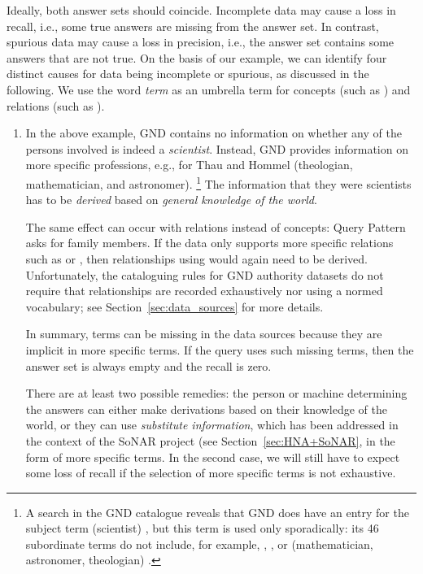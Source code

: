 Ideally, both answer sets should coincide.
Incomplete data may cause a loss in recall, i.e., some true answers are missing from the answer set.
In contrast, spurious data may cause a loss in precision, i.e., the answer set contains some answers that are not true.
On the basis of our example, we can identify four distinct causes for data being incomplete or spurious,
as discussed in the following. We use the word \emph{term} as an umbrella term for concepts (such as )
and relations (such as ).
%
\begin{enumerate}
  \item
    In the above example, \gls{GND} contains no information on whether any of the persons involved is indeed
    a \emph{scientist}. Instead, \gls{GND} provides information on more specific professions,
    e.g., for Thau and Hommel (theologian, mathematician, and astronomer).%
    \footnote{%
      A search in the \gls{GND} catalogue
      reveals that \gls{GND} does have an entry for the subject term  (scientist) \autocite{GNDScientist},
      but this term is used only sporadically: its 46 subordinate terms do not include, for example,
      , , or  (mathematician, astronomer, theologian)  \autocite{GNDScientistSub}.%
    }
    The information that they were scientists has to be \emph{derived} based on \emph{general knowledge
    of the world}.
    
    The same effect can occur with relations instead of concepts:
    Query Pattern~ asks for family members.
    If the data only supports more specific relations
    such as  or , then relationships using
     would again need to be derived.
    Unfortunately, the cataloguing rules for \gls{GND} authority datasets do not require
    that relationships are recorded exhaustively nor using a normed vocabulary;
    see Section~\ref{sec:data_sources} for more details.
    
    In summary, terms can be missing in the data sources because
    they are implicit in more specific terms.
    If the query uses such missing terms, then the answer set is always empty
    and the recall is zero.
    
    There are at least two possible remedies:
    the person or machine determining the answers can either make derivations based on their
    knowledge of the world, or they can use \emph{substitute information},
    which has been addressed in the context of the \gls{SoNAR} project (see Section~\ref{sec:HNA+SoNAR},
    in the form of more specific terms.
    In the second case, we will still have to expect some loss of recall
    if the selection of more specific terms is not exhaustive.


\end{enumerate}
